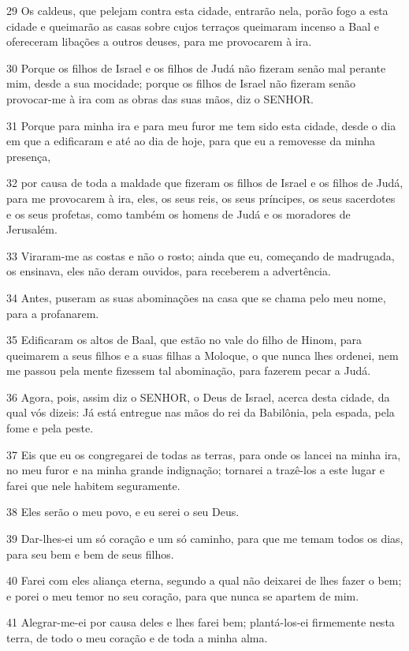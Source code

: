 \par 29 Os caldeus, que pelejam contra esta cidade, entrarão nela, porão fogo a esta cidade e queimarão as casas sobre cujos terraços queimaram incenso a Baal e ofereceram libações a outros deuses, para me provocarem à ira.
\par 30 Porque os filhos de Israel e os filhos de Judá não fizeram senão mal perante mim, desde a sua mocidade; porque os filhos de Israel não fizeram senão provocar-me à ira com as obras das suas mãos, diz o SENHOR.
\par 31 Porque para minha ira e para meu furor me tem sido esta cidade, desde o dia em que a edificaram e até ao dia de hoje, para que eu a removesse da minha presença,
\par 32 por causa de toda a maldade que fizeram os filhos de Israel e os filhos de Judá, para me provocarem à ira, eles, os seus reis, os seus príncipes, os seus sacerdotes e os seus profetas, como também os homens de Judá e os moradores de Jerusalém.
\par 33 Viraram-me as costas e não o rosto; ainda que eu, começando de madrugada, os ensinava, eles não deram ouvidos, para receberem a advertência.
\par 34 Antes, puseram as suas abominações na casa que se chama pelo meu nome, para a profanarem.
\par 35 Edificaram os altos de Baal, que estão no vale do filho de Hinom, para queimarem a seus filhos e a suas filhas a Moloque, o que nunca lhes ordenei, nem me passou pela mente fizessem tal abominação, para fazerem pecar a Judá.
\par 36 Agora, pois, assim diz o SENHOR, o Deus de Israel, acerca desta cidade, da qual vós dizeis: Já está entregue nas mãos do rei da Babilônia, pela espada, pela fome e pela peste.
\par 37 Eis que eu os congregarei de todas as terras, para onde os lancei na minha ira, no meu furor e na minha grande indignação; tornarei a trazê-los a este lugar e farei que nele habitem seguramente.
\par 38 Eles serão o meu povo, e eu serei o seu Deus.
\par 39 Dar-lhes-ei um só coração e um só caminho, para que me temam todos os dias, para seu bem e bem de seus filhos.
\par 40 Farei com eles aliança eterna, segundo a qual não deixarei de lhes fazer o bem; e porei o meu temor no seu coração, para que nunca se apartem de mim.
\par 41 Alegrar-me-ei por causa deles e lhes farei bem; plantá-los-ei firmemente nesta terra, de todo o meu coração e de toda a minha alma.
